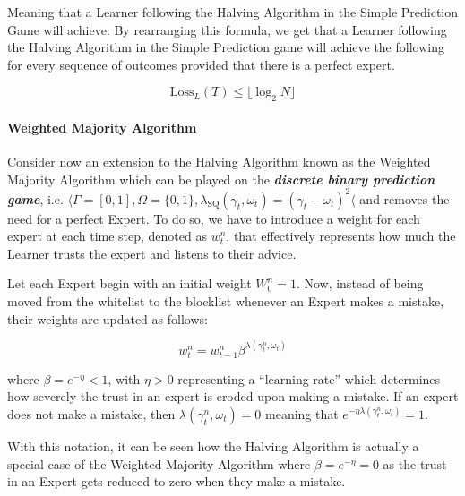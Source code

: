 Meaning that a Learner following the Halving Algorithm in the Simple Prediction Game will achieve:
By rearranging this formula, we get that a Learner following the Halving Algorithm in the Simple Prediction game will achieve the following for every sequence of outcomes provided that there is a perfect expert.

\begin{equation}
    \text{Loss}_L(T) \leq \lfloor \log_2 N \rfloor
\end{equation}

\paragraph{Weighted Majority Algorithm}\label{paragraph:weighted_majority_algorithm}
Consider now an extension to the Halving Algorithm known as the Weighted Majority Algorithm which can be played on the \textbf{\textit{discrete binary prediction game}}, i.e. $\langle \Gamma = [0, 1], \Omega = \{0, 1\}, \lambda_\text{SQ}(\gamma_t, \omega_t) = {(\gamma_t - \omega_t)}^2 \langle$ and removes the need for a perfect Expert. To do so, we have to introduce a weight for each expert at each time step, denoted as $w^n_t$, that effectively represents how much the Learner trusts the expert and listens to their advice.

Let each Expert begin with an initial weight $W^n_0 = 1$. Now, instead of being moved from the whitelist to the blocklist whenever an Expert makes a mistake, their weights are updated as follows:

\begin{equation}
    w^n_t = w^n_{t-1} \beta^{\lambda(\gamma^n_t, \omega_t)}
\end{equation}

where $\beta = e^{-\eta} < 1$, with $\eta > 0$ representing a ``learning rate'' which determines how severely the trust in an expert is eroded upon making a mistake. If an expert does not make a mistake, then $\lambda(\gamma^n_t, \omega_t) = 0$ meaning that $e^{-\eta \lambda(\gamma^n_t, \omega_t)} = 1$.

With this notation, it can be seen how the Halving Algorithm is actually a special case of the Weighted Majority Algorithm where $\beta = e^{-\eta} = 0$ as the trust in an Expert gets reduced to zero when they make a mistake.

